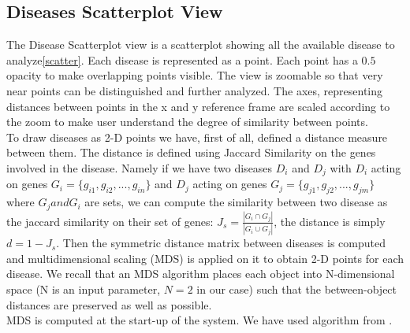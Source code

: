 \documentclass[12pt,twocolumn,twoside]{article}
\begin{document}
\subsection*{Diseases Scatterplot View}
The Disease Scatterplot view is a scatterplot showing all the available disease to analyze\ref{scatter}. Each disease is represented as a point. Each point has a $0.5$ opacity to make overlapping points visible. The view is zoomable so that very near points can be distinguished and further analyzed. The axes, representing distances between points in the x and y reference frame are scaled according to the zoom to make user understand the degree of similarity between points.\\ 
To draw diseases as 2-D points we have, first of all, defined a distance measure between them. The distance is defined using Jaccard Similarity on the genes involved in the disease. Namely if we have two diseases $D_i$ and $D_j$ with $D_i$ acting on genes $G_i=\{g_{i1},g_{i2},...,g_{in}\}$ and $D_j$ acting on genes $G_j=\{g_{j1},g_{j2},...,g_{jm}\}$ where $G_j and G_i$ are sets, we can compute the similarity between two disease as the jaccard similarity on their set of genes: $J_s = \frac{|G_i \cap G_j|}{|G_i \cup G_j|}$, the distance is simply $d =1-J_s$.  Then the symmetric distance matrix between diseases is computed and multidimensional scaling (MDS) is applied on it to obtain 2-D points for each disease. We recall that an MDS algorithm places each object into N-dimensional space (N is an input parameter, $N=2$ in our case) such that the between-object distances are preserved as well as possible.\\ MDS is computed at the start-up of the system. We have used algorithm from \cite{mds_js}.
\end{document}
